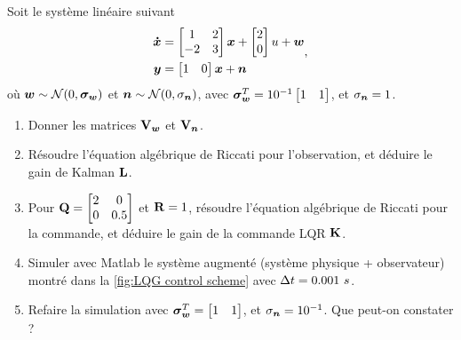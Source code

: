 \begin{exercise}
	Soit le système linéaire suivant 
	\begin{align}
	\begin{split}
	\bm{\dot{x}}&=\begin{bmatrix} 
	1 & 2 \\ -2 & 3  
	\end{bmatrix}\bm{x} + \begin{bmatrix}
	2 \\ 0
	\end{bmatrix}u + \bm{w}  \\
	\bm{y} &= \begin{bmatrix}
	1 & 0
	\end{bmatrix}\bm{x} + \bm{n}
	\end{split},
	\end{align}
	où $\bm{w}\sim{\cal N}(0,\boldsymbol{\sigma}_{\bm{w}})$ et $\bm{n}\sim{\cal N}(0,{\sigma}_{\bm{n}})$, avec $\boldsymbol{\sigma}_{\bm{w}}^T = 10^{-1}\begin{bmatrix} 1 & 1 \end{bmatrix}$, et ${\sigma}_{\bm{n}} = 1$.
	\begin{enumerate}
		\item Donner les matrices $\mathbf{V}_{\bm w}$ et $\mathbf{V}_{\bm n}$.
		\item Résoudre l'équation algébrique de Riccati pour l'observation, et déduire le gain de Kalman $\mathbf{L}$.
		\item Pour $\mathbf{Q} = \begin{bmatrix}2&0\\0&0.5\end{bmatrix}$ et $\mathbf{R}=1$, résoudre l'équation algébrique de Riccati pour la commande, et déduire le gain de la commande LQR $\mathbf{K}$.
		\item Simuler avec Matlab le système augmenté (système physique + observateur) montré dans la \cref{fig:LQG control scheme} avec $\Delta t= 0.001~s$.
		\item Refaire la simulation avec $\boldsymbol{\sigma}_{\bm{w}}^T = \begin{bmatrix} 1 & 1 \end{bmatrix}$, et ${\sigma}_{\bm{n}} = 10^{-1}$. Que peut-on constater ?
	\end{enumerate}
\end{exercise}
